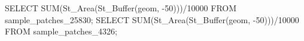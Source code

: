 \lstset{caption=Consulta SQL para la métrica TCA.,label=tca1}
\begin{SQL}
SELECT SUM(St_Area(St_Buffer(geom, -50)))/10000 FROM sample_patches_25830;
SELECT SUM(St_Area(St_Buffer(geom, -50)))/10000 FROM sample_patches_4326;
\end{SQL}

